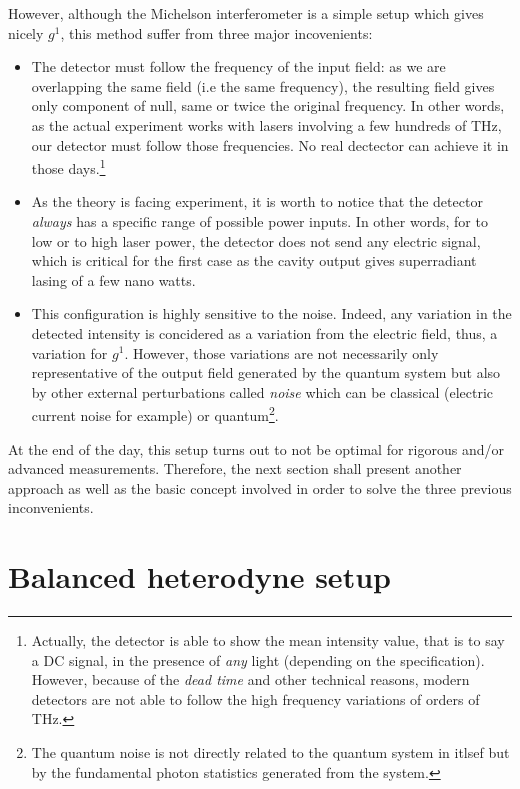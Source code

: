 \documentclass[10pt]{report}
\begin{document}
However, although the Michelson interferometer is a simple setup which gives nicely $g^1$, this method suffer from three major incovenients:
\begin{itemize}
	\item The detector must follow the frequency of the input field: as we are overlapping the same field (i.e the same frequency), the resulting field gives only component of null, same or twice the original frequency. In other words, as the actual experiment works with lasers involving a few hundreds of THz, our detector must follow those frequencies. No real dectector can achieve it in those days.\footnote{Actually, the detector is able to show the mean intensity value, that is to say a DC signal, in the presence of \textit{any} light (depending on the specification). However, because of the \textit{dead time} and other technical reasons, modern detectors are not able to follow the high frequency variations of orders of THz.}
	\item As the theory is facing experiment, it is worth to notice that the detector \textit{always} has a specific range of possible power inputs. In other words, for to low or to high laser power, the detector does not send any electric signal, which is critical for the first case as the cavity output gives superradiant lasing of a few nano watts.
	\item This configuration is highly sensitive to the noise. Indeed, any variation in the detected intensity is concidered as a variation from the electric field, thus, a variation for $g^1$. However, those variations are not necessarily only representative of the output field generated by the quantum system but also by other external perturbations called \textit{noise} which can be classical (electric current noise for example) or quantum\footnote{The quantum noise is not directly related to the quantum system in itlsef but by the fundamental photon statistics generated from the system.}.
\end{itemize}

At the end of the day, this setup turns out to not be optimal for rigorous and/or advanced measurements. Therefore, the next section shall present another approach as well as the basic concept involved in order to solve the three previous inconvenients.

\section{Balanced heterodyne setup}
\paragraph{}
\end{document}
